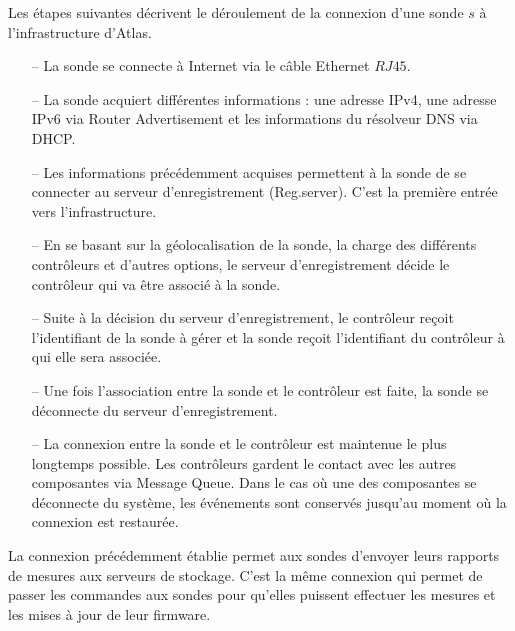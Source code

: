Les étapes suivantes décrivent le déroulement de la connexion d'une sonde  $s$ à l'infrastructure  d'Atlas. 
\begin{itemize}
	\item[--]  La sonde  se connecte à Internet via  le câble Ethernet $RJ45$.
	\item[--]   La sonde  acquiert différentes informations : une adresse IPv4, une adresse IPv6 via Router Advertisement et les informations du résolveur DNS via DHCP. 
	
	\item[--]  Les informations précédemment acquises permettent à la sonde  de se connecter  au serveur d'enregistrement (Reg.server). C'est la première entrée vers l'infrastructure.
	
	\item[--]  En se basant sur la géolocalisation de la sonde, la charge des différents contrôleurs et d'autres options,  le serveur d'enregistrement décide le contrôleur qui va  être associé à la sonde. 
	
	\item[--]  Suite à la décision du serveur d'enregistrement, le contrôleur reçoit l'identifiant de la sonde  à gérer et la sonde  reçoit l'identifiant du contrôleur  à qui elle sera associée.
	
	\item[--]  Une fois l'association entre la sonde  et le contrôleur est faite,  la sonde  se déconnecte du serveur d'enregistrement.
	
	\item[--]  La connexion entre la sonde  et le contrôleur est  maintenue le plus longtemps possible. Les contrôleurs gardent le contact avec les autres composantes via Message Queue. Dans le cas où  une des composantes se déconnecte du système, les événements sont conservés jusqu'au moment où la connexion est restaurée.
	
\end{itemize}

La connexion précédemment établie permet aux sondes  d'envoyer leurs  rapports de mesures  aux serveurs de stockage. C'est la même connexion qui permet de passer les commandes aux sondes pour qu'elles puissent effectuer les mesures et les mises à jour de leur firmware.








